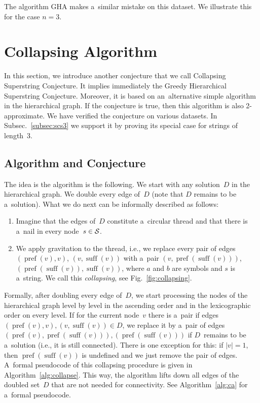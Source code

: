 \documentclass[11pt,letterpaper]{article}
\DeclareMathOperator{\pref}{pref}
\DeclareMathOperator{\suff}{suff}
\begin{document}
 The algorithm GHA makes a~similar mistake on this dataset. We illustrate this for the case $n=3$.



\section{Collapsing Algorithm}
In this section, we introduce another conjecture that
we call Collapsing Superstring Conjecture. It implies immediately the Greedy Hierarchical Superstring Conjecture. Moreover, it is based on an~alternative simple algorithm in the hierarchical graph. If the conjecture is true, then this algorithm is also 2-approximate. We have verified the conjecture on various datasets. In Subsec.~\ref{subsec:scs3} we support it by proving its special case for strings of length~3.

\subsection{Algorithm and Conjecture}
The idea is the algorithm is the following. 
We start with any solution~$D$ in the hierarchical graph. 
We double every edge of~$D$ (note that $D$ remains to be a~solution). What we do next can be informally described as follows:
\begin{enumerate}
\item Imagine that the edges of~$D$ constitute a~circular thread and that there is a~nail in every node~$s \in {\cal S}$.
\item We apply gravitation to the thread, i.e., we replace every pair of edges $(\pref(v), v)$, $(v, \suff(v))$ 
with a~pair $(v, \pref(\suff(v)))$, $(\pref(\suff(v)), \suff(v))$, where $a$ and $b$ are symbols and $s$ is a~string. We call this {\em collapsing}, see Fig.~\ref{fig:collapsing}.
\end{enumerate}
Formally, after doubling every edge of~$D$, we start processing the nodes of the hierarchical graph level by level in the ascending order and in the lexicographic order on every level. If for the current node~$v$ there is a~pair if edges $(\pref(v), v), (v, \suff(v)) \in D$, we replace it by a~pair of edges $(\pref(v), \pref(\suff(v))), (\pref(\suff(v)))$ if $D$~remains to be a~solution (i.e., it is still connected). There is one exception for this: if $|v|=1$, then $\pref(\suff(v))$ is undefined and we just remove the pair of edges. 
A~formal pseudocode of this collapsing procedure is given in Algorithm~\ref{alg:collapse}. This way, the algorithm lifts down all edges of the doubled set~$D$ that are not needed for connectivity. See Algorithm~\ref{alg:ca} for a~formal pseudocode.
\end{document}
